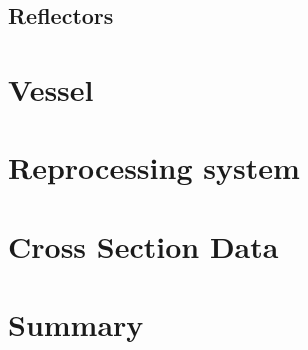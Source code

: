 \subsection{Reflectors}

\section{Vessel}
\label{sec:msbr-vessel}

\section{Reprocessing system}
\label{sec:msbr-reprocessing-system}

\section{Cross Section Data}

\section{Summary}

